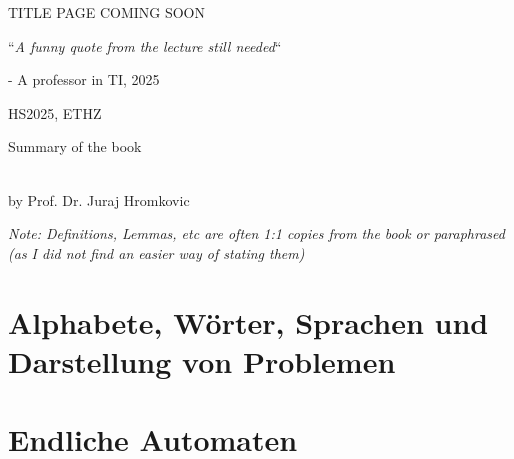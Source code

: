 \documentclass{article}
\begin{document}
\startDocument
\usetcolorboxes

\vspace{2cm}
\begin{Huge}
    \begin{center}
        TITLE PAGE COMING SOON
    \end{center}
\end{Huge}


\vspace{4cm}
\begin{center}
    \begin{Large}
        ``\textit{A funny quote from the lecture still needed}``
    \end{Large}

    \hspace{3cm} - A professor in TI, 2025
\end{center}

\vspace{3cm}
\begin{center}
    HS2025, ETHZ\\[0.2cm]
    \begin{Large}
        Summary of the book \color{MidnightBlue}\color{black} 
    \end{Large}\\[0.2cm]
    by Prof. Dr. Juraj Hromkovic
\end{center}

\newpage


\begin{scriptsize}
    \textit{Note: Definitions, Lemmas, etc are often 1:1 copies from the book or paraphrased (as I did not find an easier way of stating them)}
\end{scriptsize}

\newpage





\newsection
\section{Alphabete, Wörter, Sprachen und Darstellung von Problemen}





\newsection
\section{Endliche Automaten}


\end{document}
